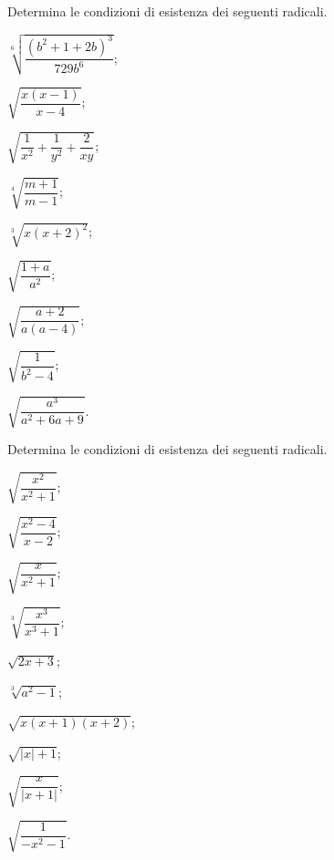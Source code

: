 \begin{esercizio}[\Ast]
Determina le condizioni di esistenza dei seguenti radicali.
 \label{ese:2.14}
 \begin{multicols}{3}
 \begin{enumeratea}
 \item $\sqrt[6]{\dfrac{\left(b^2+1+2b\right)^3}{729b^6}}$;
 \item $\sqrt{\dfrac{x(x-1)}{x-4}}$;
 \item $\sqrt{\dfrac 1{x^2}+\dfrac 1{y^2}+\dfrac 2{xy}}$;
 \item $\sqrt[4]{\dfrac{m+1}{m-1}}$;
 \item $\sqrt[3]{x(x+2)^2}$;
 \item $\sqrt{\dfrac{1+a}{a^2}}$;
 \item $\sqrt{\dfrac{a+2}{a(a-4)}}$;
 \item $\sqrt{\dfrac 1{b^2-4}}$;
 \item $\sqrt{\dfrac{a^3}{a^2+6a+9}}$.
 \end{enumeratea}
 \end{multicols}
\end{esercizio}

\begin{esercizio}[\Ast]
 \label{ese:2.15}
Determina le condizioni di esistenza dei seguenti radicali.
 \begin{multicols}{3}
 \begin{enumeratea}
 \item $\sqrt{\dfrac{x^2}{x^2+1}}$;
 \item $\sqrt{\dfrac{x^2-4}{x-2}}$;
 \item $\sqrt{\dfrac x{x^2+1}}$;
 \item $\sqrt[3]{\dfrac{x^3}{x^3+1}}$;
 \item $\sqrt{2x+3}$;
 \item $\sqrt[3]{a^2-1}$;
 \item $\sqrt{x(x+1)(x+2)}$;
 \item $\sqrt{\left|x\right|+1}$;
 \item $\sqrt{\dfrac x{\left|x+1\right|}}$;
 \item $\sqrt{\dfrac 1{-x^2-1}}$.
 \end{enumeratea}
 \end{multicols}
\end{esercizio}

